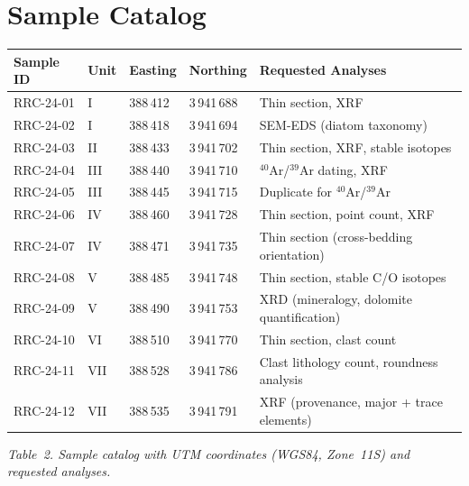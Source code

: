 \section{Sample Catalog}

\begin{tabularx}{\linewidth}{@{} l l l l >{\raggedright\arraybackslash}X @{}}
\toprule
\textbf{Sample ID} & \textbf{Unit} & \textbf{Easting} & \textbf{Northing} & \textbf{Requested Analyses} \\
\midrule
RRC-24-01 & I   & 388\,412 & 3\,941\,688 & Thin section, XRF \\
RRC-24-02 & I   & 388\,418 & 3\,941\,694 & SEM-EDS (diatom taxonomy) \\
RRC-24-03 & II  & 388\,433 & 3\,941\,702 & Thin section, XRF, stable isotopes \\
RRC-24-04 & III & 388\,440 & 3\,941\,710 & $^{40}$Ar/$^{39}$Ar dating, XRF \\
RRC-24-05 & III & 388\,445 & 3\,941\,715 & Duplicate for $^{40}$Ar/$^{39}$Ar \\
RRC-24-06 & IV  & 388\,460 & 3\,941\,728 & Thin section, point count, XRF \\
RRC-24-07 & IV  & 388\,471 & 3\,941\,735 & Thin section (cross-bedding orientation) \\
RRC-24-08 & V   & 388\,485 & 3\,941\,748 & Thin section, stable C/O isotopes \\
RRC-24-09 & V   & 388\,490 & 3\,941\,753 & XRD (mineralogy, dolomite quantification) \\
RRC-24-10 & VI  & 388\,510 & 3\,941\,770 & Thin section, clast count \\
RRC-24-11 & VII & 388\,528 & 3\,941\,786 & Clast lithology count, roundness analysis \\
RRC-24-12 & VII & 388\,535 & 3\,941\,791 & XRF (provenance, major + trace elements) \\
\bottomrule
\end{tabularx}
\vspace{3pt}
{\small\itshape\color{stone}Table~2. Sample catalog with UTM coordinates (WGS84, Zone~11S) and requested analyses.}

